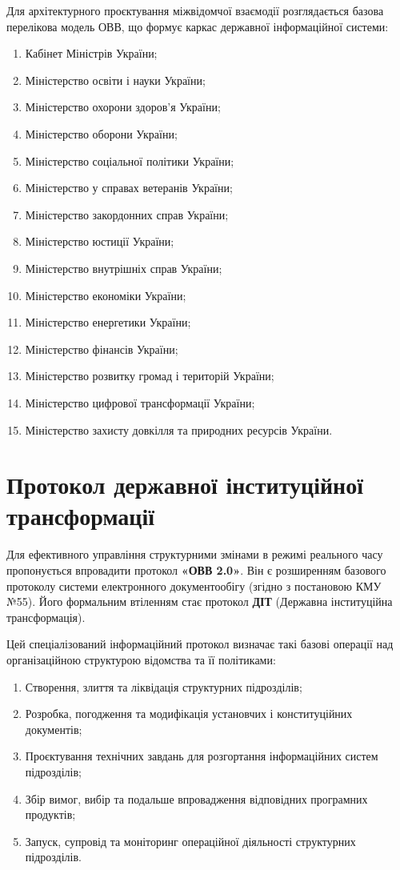 Для архітектурного проєктування міжвідомчої взаємодії розглядається базова перелікова модель ОВВ, що формує каркас державної інформаційної системи:

\begin{enumerate}
    \item Кабінет Міністрів України;
    \item Міністерство освіти і науки України;
    \item Міністерство охорони здоров'я України;
    \item Міністерство оборони України;
    \item Міністерство соціальної політики України;
    \item Міністерство у справах ветеранів України;
    \item Міністерство закордонних справ України;
    \item Міністерство юстиції України;
    \item Міністерство внутрішніх справ України;
    \item Міністерство економіки України;
    \item Міністерство енергетики України;
    \item Міністерство фінансів України;
    \item Міністерство розвитку громад і територій України;
    \item Міністерство цифрової трансформації України;
    \item Міністерство захисту довкілля та природних ресурсів України.
\end{enumerate}

\newpage
\section{Протокол державної інституційної трансформації}

Для ефективного управління структурними змінами в режимі реального часу пропонується впровадити протокол \textbf{«ОВВ 2.0»}. Він є розширенням базового протоколу системи електронного документообігу (згідно з постановою КМУ №55). Його формальним втіленням стає протокол \textbf{ДІТ} (Державна інституційна трансформація).

Цей спеціалізований інформаційний протокол визначає такі базові операції над організаційною структурою відомства та її політиками:

\begin{enumerate}
    \item Створення, злиття та ліквідація структурних підрозділів;
    \item Розробка, погодження та модифікація установчих і конституційних документів;
    \item Проєктування технічних завдань для розгортання інформаційних систем підрозділів;
    \item Збір вимог, вибір та подальше впровадження відповідних програмних продуктів;
    \item Запуск, супровід та моніторинг операційної діяльності структурних підрозділів.
\end{enumerate}

